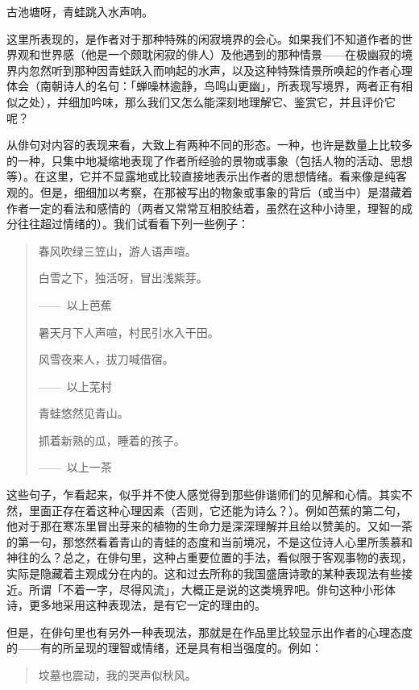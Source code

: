 {  \begin{center}
      古池塘呀，青蛙跳入水声响。\footnotemark[1]
  \end{center}


  这里所表现的，是作者对于那种特殊的闲寂境界的会心。如果我们不知道作者的世界观和世界感（他是一个颇耽闲寂的俳人）及他遇到的那种情景——在极幽寂的境界内忽然听到那种因青蛙跃入而响起的水声，以及这种特殊情景所唤起的作者心理体会（南朝诗人的名句：「蝉噪林逾静，鸟鸣山更幽」，所表现写境界，两者正有相似之处），并细加吟味，那么我们又怎么能深刻地理解它、鉴赏它，并且评价它呢？

  从俳句对内容的表现来看，大致上有两种不同的形态。一种，也许是数量上比较多的一种，只集中地凝缩地表现了作者所经验的景物或事象（包括人物的活动、思想等）。在这里，它并不显露地或比较直接地表示出作者的思想情绪。看来像是纯客观的。但是，细细加以考察，在那被写出的物象或事象的背后（或当中）是潜藏着作者一定的看法和感情的（两者又常常互相胶结着，虽然在这种小诗里，理智的成分往往超过情绪的）。我们试看看下列一些例子：
  \begin{quote}
      春风吹绿三笠山，游人语声喧。

      白雪之下，独活呀，冒出浅紫芽。

      \hfill——~以上芭蕉

      暑天月下人声喧，村民引水入干田。

      风雪夜来人，拔刀喊借宿。

      \hfill ——~以上芜村

      青蛙悠然见青山。

      抓着新熟的瓜，睡着的孩子。

      \hfill ——~以上一茶
  \end{quote}

  这些句子，乍看起来，似乎并不使人感觉得到那些俳谐师们的见解和心情。其实不然，里面正存在着这种心理因素（否则，它还能为诗么？）。例如芭蕉的第二句，他对于那在寒冻里冒出芽来的植物的生命力是深深理解并且给以赞美的。又如一茶的第一句，那悠然看着青山的青蛙的态度和当前境况，不是这位诗人心里所羡慕和神往的么？总之，在俳句里，这种占重要位置的手法，看似限于客观事物的表现，实际是隐藏着主观成分在内的。这和过去所称的我国盛唐诗歌的某种表现法有些接近。所谓「不着一字，尽得风流」，大概正是说的这类境界吧。俳句这种小形体诗，更多地采用这种表现法，是有它一定的理由的。

  但是，在俳句里也有另外一种表现法，那就是在作品里比较显示出作者的心理态度的——有的所呈现的理智或情绪，还是具有相当强度的。例如：
  \begin{quote}
      坟墓也震动，我的哭声似秋风。


\end{quote}}
